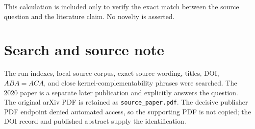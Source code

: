 \documentclass[11pt]{article}
\begin{document}
This calculation is included only to verify the exact match between the source
question and the literature claim. No novelty is asserted.

\section*{Search and source note}
The run indexes, local source corpus, exact source wording, titles, DOI,
$ABA=ACA$, and close kernel-complementability phrases were searched. The 2020
paper is a separate later publication and explicitly answers the question.
The original arXiv PDF is retained as \texttt{source\_paper.pdf}. The decisive
publisher PDF endpoint denied automated access, so the supporting PDF is not
copied; the DOI record and published abstract supply the identification.
\end{document}

